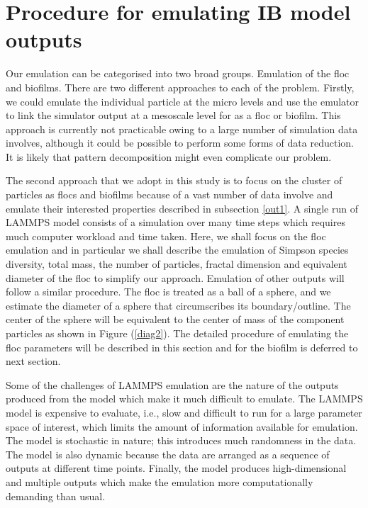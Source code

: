 \section{Procedure for emulating IB model outputs}
Our emulation can be categorised into two broad groups. Emulation of the floc and biofilms. There are two different approaches to each of the problem. Firstly, we could emulate the individual particle at the micro levels and use the emulator to link the simulator output at a mesoscale level for as a floc or biofilm. This approach is currently not practicable owing to a large number of simulation data involves, although it could be possible to perform some forms of data reduction. It is likely that pattern decomposition might even complicate our problem. 

The second approach that we adopt in this study is to focus on the cluster of particles as flocs and biofilms because of a vast number of data involve and emulate their interested properties described in subsection \ref{out1}. A single run of LAMMPS model consists of a simulation over many time steps which requires much computer workload and time taken. Here, we shall focus on the floc emulation and in particular we shall describe the emulation of Simpson species diversity, total mass, the number of particles, fractal dimension and equivalent diameter of the floc to simplify our approach. Emulation of other outputs will follow a similar procedure. The floc is treated as a ball of a sphere, and we estimate the diameter of a sphere that circumscribes its boundary/outline. The center of the sphere will be equivalent to the center of mass of the component particles as shown in Figure (\ref{diag2}). The detailed procedure of emulating the floc parameters will be described in this section and for the biofilm is deferred to next section. 

Some of the challenges of LAMMPS emulation are the nature of the outputs produced from the model which make it much difficult to emulate. The LAMMPS model is expensive to evaluate, i.e., slow and difficult to run for a large parameter space of interest, which limits the amount of information available for emulation. The model is stochastic in nature; this introduces much randomness in the data. The model is also dynamic because the data are arranged as a sequence of outputs at different time points. Finally, the model produces high-dimensional and multiple outputs which make the emulation more computationally demanding than usual.

